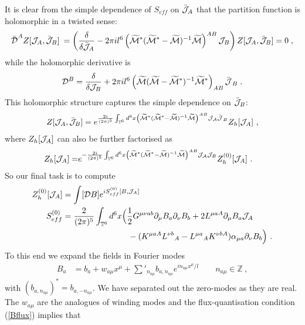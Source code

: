 \documentclass[11pt]{article}
\numberwithin{equation}{section}
\begin{document}
It is clear from the simple dependence of $S_{eff}$ on $\bar {\cal J}_{A}$ that the partition function is holomorphic in a twisted sense:
\begin{align}
{\bar {\cal D}}^{A}Z[{\cal J}_{A},\bar {\cal J}_B]\:=\left(\frac{\delta}{\delta  \bar {\cal J}_A}-2\pi i l^6\left(\widetilde{\cal M}^*(\widetilde{\cal M}^*-\widetilde{\cal M})^{-1}\widetilde{\cal M}\right)^{AB}{\cal J}_{B} \right)Z[{\cal J}_{A},\bar {\cal J}_B]=0	\;,
\end{align}
while the holomorphic derivative is 
\begin{align}
{\cal D}^B = 	\frac{\delta}{\delta {\cal J}_{B}}+2\pi i l^6\left(\widetilde{\cal M}(\widetilde{\cal M}-\widetilde{\cal M}^*)^{-1}\widetilde{\cal M}^*\right)_{AB}{\bar {\cal J}}_{B}\;.
\end{align}
 This holomorphic structure  captures the simple dependence on $\bar {\cal J}_B$:
\begin{align}
Z[{\cal J}_{A},\bar{\cal J}_B] = e^{\frac{2i}{(2\pi)^5} \int_{{\mathbb T}^6} d^6x  \left(\widetilde{\cal M}^*(\widetilde{\cal M}^*-\widetilde{\cal M})^{-1}\widetilde{\cal M}\right)^{AB}{\cal J_A}{\bar {\cal J}}_B}	  Z_h[{\cal J}_{A}]	\ ,
\end{align}
where $Z_h[{\cal J}_A]$ can also be further factorised as
\begin{align}
Z_h[{\cal J}_{A}]	= &e^{-\frac{2i}{(2\pi)^5} \int_{{\mathbb T}^6} d^6x  \left({\cal \widetilde M}^*(\widetilde{\cal M}^*-\widetilde{\cal M})^{-1}\widetilde{\cal M}\right)^{AB}{\cal J_A}{{\cal J}}_B}Z_h^{(0) }[{\cal J}_{A}]\ .
\end{align}
So our final task is to compute
\begin{align}
    Z_h^{(0)}[{\cal J}_{A}] &= \int [\mathcal DB]e^{i S^{(0)}_{eff}[B,{\cal J}_A]}\nonumber\\
    S^{(0)}_{eff}& = \frac{2}{(2\pi)^5} \int_{{\mathbb T}^6} d^6x \Big(\frac12 G^{\mu\nu ab}\partial_\mu B_a\partial_\nu B_b +2L^{\mu a A}\partial_\mu B_a{\cal J}_{A}\nonumber\\ &\qquad\qquad\qquad\qquad-(K^{\mu a A}L^{\nu b}{}_A-L^{\mu a}{}_AK^{\nu b A})\alpha_{\mu a}\partial_\nu B_b 	\Big)\ .
\end{align}
To this end we expand the fields in Fourier modes
\begin{align}
B_a &= b_a + {w_{a\mu}}{} x^\mu +\sum'_{n_{a\mu}} b_{a,n_{a\mu}}e^{in_{a\mu} x^\mu /l}\qquad	n_{a\mu} \in {\mathbb Z}\ ,
\end{align}
with  $(b_{a,n_{a\mu}})^*= b_{a,-n_{a\mu}}$. We have separated out the zero-modes as they are real. The $w_{a \mu}$ are the analogues of winding modes and the flux-quantisation condition (\ref{Bflux}) implies that
\end{document}
